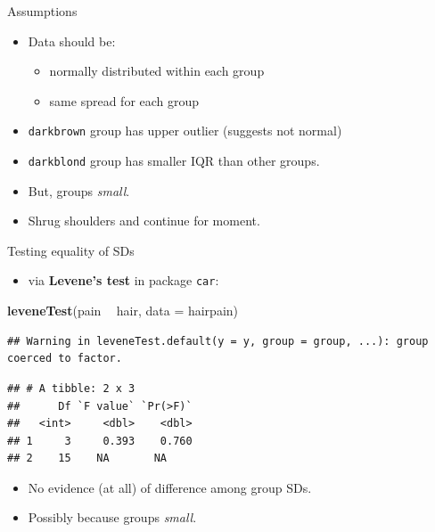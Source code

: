 \documentclass[
  ignorenonframetext,
]{beamer}
\newenvironment{Shaded}{\begin{snugshade}}{\end{snugshade}}
\newcommand{\DataTypeTok}[1]{\textcolor[rgb]{0.13,0.29,0.53}{#1}}
\newcommand{\KeywordTok}[1]{\textcolor[rgb]{0.13,0.29,0.53}{\textbf{#1}}}
\newcommand{\NormalTok}[1]{#1}
\newcommand{\OperatorTok}[1]{\textcolor[rgb]{0.81,0.36,0.00}{\textbf{#1}}}
\newcommand{\StringTok}[1]{\textcolor[rgb]{0.31,0.60,0.02}{#1}}
\providecommand{\tightlist}{%
  \setlength{\itemsep}{0pt}\setlength{\parskip}{0pt}}
\begin{document}
\begin{frame}[fragile]{Assumptions}
\protect\hypertarget{assumptions}{}

\begin{itemize}
\item
  Data should be:

  \begin{itemize}
  \item
    normally distributed within each group
  \item
    same spread for each group
  \end{itemize}
\item
  \texttt{darkbrown} group has upper outlier (suggests not normal)
\item
  \texttt{darkblond} group has smaller IQR than other groups.
\item
  But, groups \emph{small}.
\item
  Shrug shoulders and continue for moment.
\end{itemize}

\end{frame}

\begin{frame}[fragile]{Testing equality of SDs}
\protect\hypertarget{testing-equality-of-sds}{}

\begin{itemize}
\tightlist
\item
  via \textbf{Levene's test} in package \texttt{car}:
\end{itemize}

\small

\begin{Shaded}
\begin{Highlighting}[]
\KeywordTok{leveneTest}\NormalTok{(pain }\OperatorTok{~}\StringTok{ }\NormalTok{hair, }\DataTypeTok{data =}\NormalTok{ hairpain)}
\end{Highlighting}
\end{Shaded}

\begin{verbatim}
## Warning in leveneTest.default(y = y, group = group, ...): group coerced to factor.
\end{verbatim}

\begin{verbatim}
## # A tibble: 2 x 3
##      Df `F value` `Pr(>F)`
##   <int>     <dbl>    <dbl>
## 1     3     0.393    0.760
## 2    15    NA       NA
\end{verbatim}

\normalsize

\begin{itemize}
\item
  No evidence (at all) of difference among group SDs.
\item
  Possibly because groups \emph{small}.
\end{itemize}

\end{frame}
\end{document}
